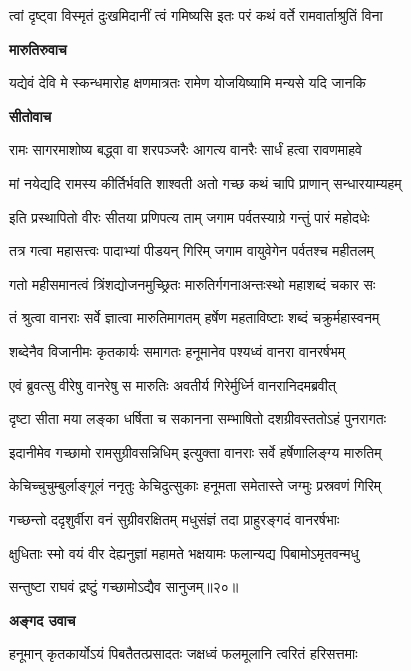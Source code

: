\twolineshloka
{त्वां दृष्ट्वा विस्मृतं दुःखमिदानीं त्वं गमिष्यसि}
{इतः परं कथं वर्ते रामवार्ताश्रुतिं विना} %

\textbf{मारुतिरुवाच}

\twolineshloka
{यद्येवं देवि मे स्कन्धमारोह क्षणमात्रतः}
{रामेण योजयिष्यामि मन्यसे यदि जानकि} %

\textbf{सीतोवाच}

\twolineshloka
{रामः सागरमाशोष्य बद्ध्वा वा शरपञ्जरैः}
{आगत्य वानरैः सार्धं हत्वा रावणमाहवे} %

\twolineshloka
{मां नयेद्यदि रामस्य कीर्तिर्भवति शाश्वती}
{अतो गच्छ कथं चापि प्राणान् सन्धारयाम्यहम्} %

\twolineshloka
{इति प्रस्थापितो वीरः सीतया प्रणिपत्य ताम्}
{जगाम पर्वतस्याग्रे गन्तुं पारं महोदधेः} %

\twolineshloka
{तत्र गत्वा महासत्त्वः पादाभ्यां पीडयन् गिरिम्}
{जगाम वायुवेगेन पर्वतश्च महीतलम्} %

\twolineshloka
{गतो महीसमानत्वं त्रिंशद्योजनमुच्छ्रितः}
{मारुतिर्गगनाअन्तःस्थो महाशब्दं चकार सः} %

\twolineshloka
{तं श्रुत्वा वानराः सर्वे ज्ञात्वा मारुतिमागतम्}
{हर्षेण महताविष्टाः शब्दं चक्रुर्महास्वनम्} %

\twolineshloka
{शब्देनैव विजानीमः कृतकार्यः समागतः}
{हनूमानेव पश्यध्वं वानरा वानरर्षभम्} %

\twolineshloka
{एवं ब्रुवत्सु वीरेषु वानरेषु स मारुतिः}
{अवतीर्य गिरेर्मुर्ध्नि वानरानिदमब्रवीत्} %

\twolineshloka
{दृष्टा सीता मया लङ्का धर्षिता च सकानना}
{सम्भाषितो दशग्रीवस्ततोऽहं पुनरागतः} %

\twolineshloka
{इदानीमेव गच्छामो रामसुग्रीवसन्निधिम्}
{इत्युक्ता वानराः सर्वे हर्षेणालिङ्ग्य मारुतिम्} %

\twolineshloka
{केचिच्चुचुम्बुर्लाङ्गूलं ननृतुः केचिदुत्सुकाः}
{हनूमता समेतास्ते जग्मुः प्रस्रवणं गिरिम्} %

\twolineshloka
{गच्छन्तो ददृशुर्वीरा वनं सुग्रीवरक्षितम्}
{मधुसंज्ञं तदा प्राहुरङ्गदं वानरर्षभाः} %

\twolineshloka
{क्षुधिताः स्मो वयं वीर देह्यनुज्ञां महामते}
{भक्षयामः फलान्यद्य पिबामोऽमृतवन्मधु} %

{सन्तुष्टा राघवं द्रष्टुं गच्छामोऽद्यैव सानुजम्॥२०॥} %


\textbf{अङ्गद उवाच}

\twolineshloka
{हनूमान् कृतकार्योऽयं पिबतैतत्प्रसादतः}
{जक्षध्वं फलमूलानि त्वरितं हरिसत्तमाः} %

